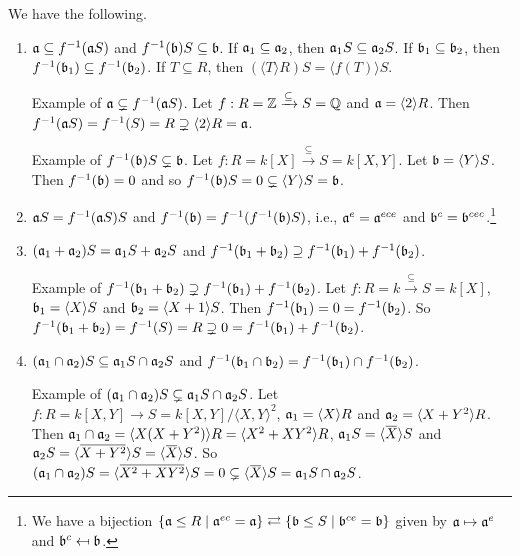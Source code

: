 \begin{proposition}\label{1.63}
    We have the following.
    \begin{enumerate}
        \item\label{1.63a} $\mathfrak{a} \subseteq f^{-1}(\mathfrak{a} S)$ and $f^{-1}(\mathfrak{b})S \subseteq \mathfrak{b}$. If $\mathfrak{a}_1 \subseteq \mathfrak{a}_2$, then $\mathfrak{a}_1S \subseteq \mathfrak{a}_2S$. If $\mathfrak{b}_1 \subseteq \mathfrak{b}_2$, then $f^{-1}(\mathfrak{b}_1) \subseteq f^{-1}(\mathfrak{b}_2)$. If $T \subseteq R$, then $(\langle T \rangle R) S = \langle f(T) \rangle S$. \par
            Example of $\mathfrak{a} \subsetneq f^{-1}(\mathfrak{a} S)$. Let $f: R = \mathbb{Z} \xrightarrow {\subseteq} S = \mathbb{Q}$ and $\mathfrak{a} = \langle 2 \rangle R$. Then $f^{-1}(\mathfrak{a} S) = f^{-1}(S) = R \supsetneq \langle 2 \rangle R = \mathfrak{a}$. \par 
            Example of $f^{-1}(\mathfrak{b})S \subsetneq \mathfrak{b}$. Let $f: R = k[X] \xrightarrow {\subseteq } S = k[X,Y]$. Let $\mathfrak{b} = \langle Y \rangle S$. Then $f^{-1}(\mathfrak{b}) = 0$ and so $f^{-1}(\mathfrak{b})S = 0 \subsetneq \langle Y \rangle S = \mathfrak{b}$.
        \item\label{1.63b} $\mathfrak{a} S = f^{-1}(\mathfrak{a} S)S$ and $f^{-1}(\mathfrak{b}) = f^{-1}(f^{-1}(\mathfrak{b})S)$, i.e., $\mathfrak{a}^{e} = \mathfrak{a}^{ece}$ and $\mathfrak{b}^{c} = \mathfrak{b}^{cec}$.\footnote[2]{We have a bijection $\{\mathfrak{a} \leq R \mid \mathfrak{a}^{ec} = \mathfrak{a}\} \rightleftarrows \{\mathfrak{b} \leq S \mid \mathfrak{b}^{ce} = \mathfrak{b}\}$ given by $\mathfrak{a} \mapsto \mathfrak{a}^{e}$ and $\mathfrak{b}^{c} \mapsfrom \mathfrak{b}$.}
        \item\label{1.63c} $(\mathfrak{a}_1 + \mathfrak{a}_2)S = \mathfrak{a}_1S + \mathfrak{a}_2S$ and $f^{-1}(\mathfrak{b}_1 + \mathfrak{b}_2) \supseteq f^{-1}(\mathfrak{b}_1) + f^{-1}(\mathfrak{b}_2)$. \par  
            Example of $f^{-1}(\mathfrak{b}_1+\mathfrak{b}_2) \supsetneq f^{-1}(\mathfrak{b}_1) + f^{-1}(\mathfrak{b}_2)$. Let $f: R = k \xrightarrow \subseteq S = k[X]$, $\mathfrak{b}_1 = \langle X \rangle S$ and $\mathfrak{b}_2 = \langle X+1 \rangle S$. Then $f^{-1}(\mathfrak{b}_1) = 0 = f^{-1}(\mathfrak{b}_2)$. So $f^{-1}(\mathfrak{b}_1 + \mathfrak{b}_2) = f^{-1}(S) = R \supsetneq 0 = f^{-1}(\mathfrak{b}_1) + f^{-1}(\mathfrak{b}_2)$.
        \item\label{1.63d} $(\mathfrak{a}_1 \cap \mathfrak{a}_2)S \subseteq \mathfrak{a}_1S \cap \mathfrak{a}_2S$ and $f^{-1}(\mathfrak{b}_1 \cap \mathfrak{b}_2) = f^{-1}(\mathfrak{b}_1) \cap f^{-1}(\mathfrak{b}_2)$. \par
            Example of $(\mathfrak{a}_1 \cap \mathfrak{a}_2)S \subsetneq \mathfrak{a}_1S \cap \mathfrak{a}_2S$. Let $f: R = k[X,Y] \to S = k[X,Y]/\langle X,Y \rangle^2$, $\mathfrak{a}_1 = \langle X \rangle R$ and $\mathfrak{a}_2 = \langle X+Y^2 \rangle R$. Then $\mathfrak{a}_1 \cap \mathfrak{a}_2 = \langle X(X+Y^2) \rangle R = \langle X^2 + XY^2 \rangle R$, $\ffa_1 S = \langle \overbar X \rangle S$ and $\ffa_2 S = \langle \overbar{X+Y^2} \rangle S = \langle \overbar X \rangle S$. So $(\ffa_1 \cap \ffa_2)S = \langle \overbar{X^2+XY^2} \rangle S = 0 \subsetneq \langle \overbar X \rangle S = \ffa_1 S \cap \ffa_2 S$.

\end{enumerate}
\end{proposition}
